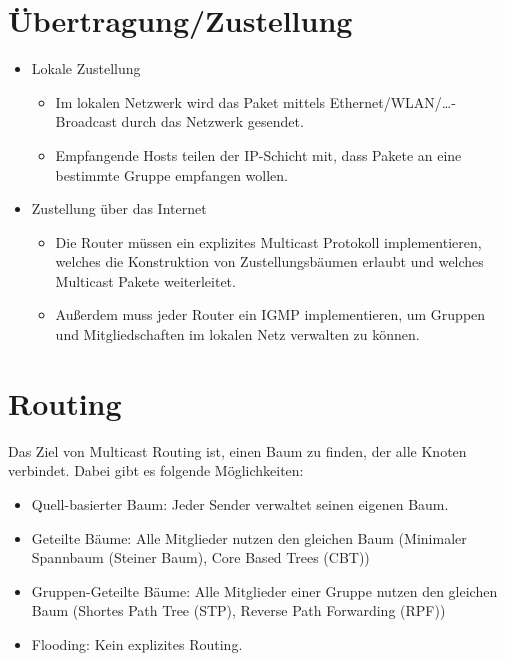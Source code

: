 \documentclass[a4paper, 11pt, accentcolor = tud3b]{tudreport}
\begin{document}
        \section{Übertragung/Zustellung}
	        \begin{itemize}
	        	\item Lokale Zustellung
		        	\begin{itemize}
		        		\item Im lokalen Netzwerk wird das Paket mittels Ethernet/WLAN/\dots-Broadcast durch das Netzwerk gesendet.
		        		\item Empfangende Hosts teilen der IP-Schicht mit, dass Pakete an eine bestimmte Gruppe empfangen wollen.
		        	\end{itemize}
	        	\item Zustellung über das Internet
		        	\begin{itemize}
		        		\item Die Router müssen ein explizites Multicast Protokoll implementieren, welches die Konstruktion von Zustellungsbäumen erlaubt und welches Multicast Pakete weiterleitet.
		        		\item Außerdem muss jeder Router ein IGMP implementieren, um Gruppen und Mitgliedschaften im lokalen Netz verwalten zu können.
		        	\end{itemize}
	        \end{itemize}

        \section{Routing}
            Das Ziel von Multicast Routing ist, einen Baum zu finden, der alle Knoten verbindet. Dabei gibt es folgende Möglichkeiten:
            \begin{itemize}
            	\item Quell-basierter Baum: Jeder Sender verwaltet seinen eigenen Baum.
            	\item Geteilte Bäume: Alle Mitglieder nutzen den gleichen Baum (Minimaler Spannbaum (Steiner Baum), Core Based Trees (CBT))
            	\item Gruppen-Geteilte Bäume: Alle Mitglieder einer Gruppe nutzen den gleichen Baum (Shortes Path Tree (STP), Reverse Path Forwarding (RPF))
            	\item Flooding: Kein explizites Routing.
            \end{itemize}
\end{document}
